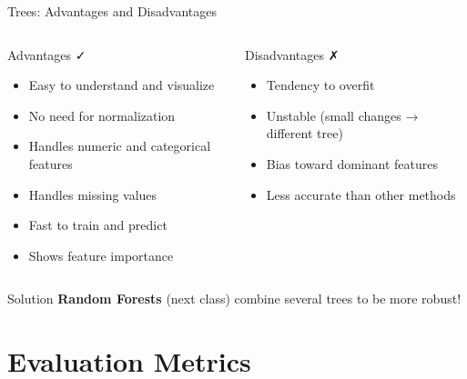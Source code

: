 \documentclass[aspectratio=169]{beamer}
\begin{document}
\begin{frame}{Trees: Advantages and Disadvantages}
\begin{columns}[T]
\begin{block}{Advantages ✓}
\begin{itemize}
    \item Easy to understand and visualize
    \item No need for normalization
    \item Handles numeric and categorical features
    \item Handles missing values
    \item Fast to train and predict
    \item Shows feature importance
\end{itemize}
\end{block}

\begin{block}{Disadvantages ✗}
\begin{itemize}
    \item Tendency to overfit
    \item Unstable (small changes → different tree)
    \item Bias toward dominant features
    \item Less accurate than other methods
\end{itemize}
\end{block}
\end{columns}

\vspace{0.5cm}
\begin{alertblock}{Solution}
\textbf{Random Forests} (next class) combine several trees to be more robust!
\end{alertblock}
\end{frame}

\section{Evaluation Metrics}
\end{document}
